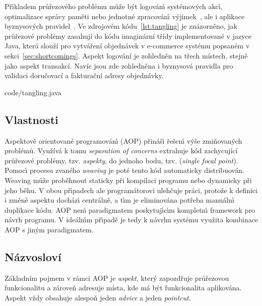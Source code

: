 Př\'{\i}kladem průřezového problému může b\'yt logován\'{\i}
systémov\'ych akc\'{\i}, optimalizace správy paměti
nebo jednotné zpracován\'{\i} v\'yjimek~\cite{kiczales1997aspect},
ale i aplikace byznysových pravidel~\cite{cemus2014aspect}.
Ve zdrojovém kódu~\ref{lst:tangling} je znázorněno, jak průřezové
problémy zasahují do kódu imaginární třídy implementované v
jazyce Java, která slouží pro vytváření objednávek v e-commerce
systému popsaném v sekci~\ref{sec:shortcomings}.
Aspekt logování je zohledněn na třech místech, stejně jako aspekt transakcí.
Navíc jsou zde zohledněna i byznysová pravidla pro validaci doručovací
a fakturační adresy objednávky.


{code/tangling.java}

\subsection{Vlastnosti}
Aspektově orientované programován\'{\i} (\gls{AOP}) přináš\'{\i} řešen\'{\i}
v\'yše zmiňovaných problémů. Využívá k tomu \textit{separation of concerns} \textendash\xspace
extrahuje kód zachycující průřezové problémy, tzv. \textit{aspekty}, do jednoho bodu, tzv. (\textit{single focal point}).
Pomoc\'{\i} procesu zvaného \textit{weaving} je poté tento kód automaticky distribuován.
Weaving může proběhnout staticky při kompilaci programu nebo dynamicky
při jeho běhu. V obou př\'{\i}padech ale programátorovi ulehčuje práci,
protože k definici i změně aspektu docház\'{\i} centrálně, a t\'{\i}m je eliminována
potřeba manuáln\'{\i} duplikace kódu. \gls{AOP} nen\'{\i} paradigmatem poskytuj\'{\i}c\'{\i}m
kompletn\'{\i} framework pro návrh programu. V ideáln\'{\i}m př\'{\i}padě je tedy k návrhu
systému využita kombinace \gls{AOP} s jin\'ym paradigmatem.

\subsection{Názvosloví}

Základním pojmem v rámci \gls{AOP} je \textit{aspekt},
který zapozdřuje průřezovou funkcionalitu a zároveň adresuje místa, kde má být
funkcionalita aplikována. Aspekt vždy obsahuje alespoň jeden \textit{advice}
a jeden \textit{pointcut}.

